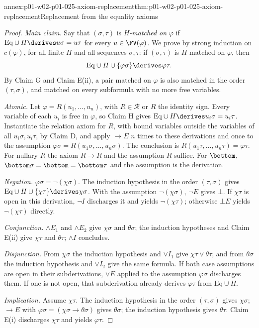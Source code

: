 \begin{annexitem}{annex:p01-w02-p01-025-axiom-replacement}{thm:p01-w02-p01-025-axiom-replacement}{Replacement from the equality axioms}
\begin{proof}
\emph{Main claim.}  Say that \((\sigma,\tau)\) is \emph{\(H\)-matched on}
\(\varphi\) if \(\mathrm{Eq}\cup H\derives u\sigma=u\tau\) for every
\(u\in\FV(\varphi)\).  We prove by strong induction on \(c(\varphi)\), for
all finite \(H\) and all sequences \(\sigma,\tau\): if \((\sigma,\tau)\) is
\(H\)-matched on \(\varphi\), then
\[
 \mathrm{Eq}\cup H\cup\{\varphi\sigma\}\derives\varphi\tau.
\]
By Claim G and Claim E(ii), a pair matched on \(\varphi\) is also matched in
the order \((\tau,\sigma)\), and matched on every subformula with no more
free variables.

\emph{Atomic.}  Let \(\varphi=R(u_1,\ldots,u_n)\), with \(R\in\mathcal R\) or
\(R\) the identity sign.  Every variable of each \(u_i\) is free in
\(\varphi\), so Claim H gives \(\mathrm{Eq}\cup H\derives
u_i\sigma=u_i\tau\).  Instantiate the relation axiom for \(R\), with bound
variables outside the variables of all \(u_i\sigma,u_i\tau\), by Claim D, and
apply \(\to E\) \(n\) times to these derivations and once to the assumption
\(\varphi\sigma=R(u_1\sigma,\ldots,u_n\sigma)\).  The conclusion is
\(R(u_1\tau,\ldots,u_n\tau)=\varphi\tau\).  For nullary \(R\) the axiom
\(R\to R\) and the assumption \(R\) suffice.  For \(\bottom\),
\(\bottom\sigma=\bottom=\bottom\tau\) and the assumption is the derivation.

\emph{Negation.}  \(\varphi\sigma=\neg(\chi\sigma)\).  The induction
hypothesis in the order \((\tau,\sigma)\) gives
\(\mathrm{Eq}\cup H\cup\{\chi\tau\}\derives\chi\sigma\).  With the assumption
\(\neg(\chi\sigma)\), \(\neg E\) gives \(\bot\).  If \(\chi\tau\) is open in
this derivation, \(\neg I\) discharges it and yields \(\neg(\chi\tau)\);
otherwise \(\bot E\) yields \(\neg(\chi\tau)\) directly.

\emph{Conjunction.}  \(\land E_1\) and \(\land E_2\) give \(\chi\sigma\) and
\(\theta\sigma\); the induction hypotheses and Claim E(ii) give \(\chi\tau\)
and \(\theta\tau\); \(\land I\) concludes.

\emph{Disjunction.}  From \(\chi\sigma\) the induction hypothesis and
\(\lor I_1\) give \(\chi\tau\lor\theta\tau\), and from \(\theta\sigma\) the
induction hypothesis and \(\lor I_2\) give the same formula.  If both case
assumptions are open in their subderivations, \(\lor E\) applied to the
assumption \(\varphi\sigma\) discharges them.  If one is not open, that
subderivation already derives \(\varphi\tau\) from \(\mathrm{Eq}\cup H\).

\emph{Implication.}  Assume \(\chi\tau\).  The induction hypothesis in the
order \((\tau,\sigma)\) gives \(\chi\sigma\); \(\to E\) with
\(\varphi\sigma=(\chi\sigma\to\theta\sigma)\) gives \(\theta\sigma\); the
induction hypothesis gives \(\theta\tau\).  Claim E(i) discharges
\(\chi\tau\) and yields \(\varphi\tau\).


\end{proof}
\end{annexitem}
